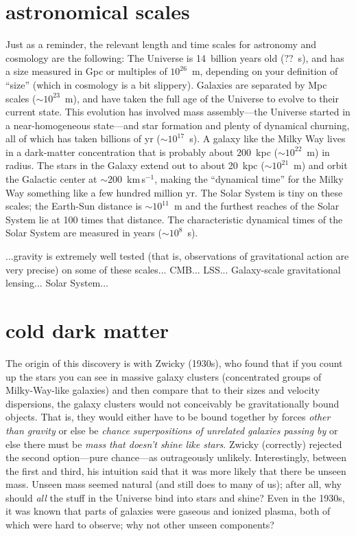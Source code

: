 \documentclass[12pt]{article}
\begin{document}
\section{astronomical scales}

Just as a reminder, the relevant length and time scales for astronomy
and cosmology are the following: The Universe is 14~billion years old
($??$~s), and has a size measured in Gpc or multiples of $10^{26}$~m,
depending on your definition of ``size'' (which in cosmology is a bit
slippery).  Galaxies are separated by Mpc scales ($\sim 10^{23}$~m),
and have taken the full age of the Universe to evolve to their current
state.  This evolution has involved mass assembly---the Universe
started in a near-homogeneous state---and star formation and plenty of
dynamical churning, all of which has taken billions of yr ($\sim
10^17$~s).  A galaxy like the Milky Way lives in a dark-matter
concentration that is probably about $200$~kpc ($\sim 10^{22}$~m) in
radius.  The stars in the Galaxy extend out to about 20~kpc ($\sim
10^{21}$~m) and orbit the Galactic center at $\sim 200$~km\,s$^{-1}$,
making the ``dynamical time'' for the Milky Way something like a few
hundred million yr.  The Solar System is tiny on these scales; the
Earth-Sun distance is $\sim 10^{11}$~m and the furthest reaches of the
Solar System lie at 100 times that distance.  The characteristic
dynamical times of the Solar System are measured in years ($\sim
10^8$~s).

...gravity is extremely well tested (that is, observations of
gravitational action are very precise) on some of these
scales... CMB... LSS... Galaxy-scale gravitational lensing... Solar
System...

\section{cold dark matter}

The origin of this discovery is with Zwicky (1930s), who found that if
you count up the stars you can see in massive galaxy clusters
(concentrated groups of Milky-Way-like galaxies) and then compare that
to their sizes and velocity dispersions, the galaxy clusters would not
conceivably be gravitationally bound objects.  That is, they would
either have to be bound together by forces \emph{other than gravity}
or else be \emph{chance superpositions of unrelated galaxies passing
  by} or else there must be \emph{mass that doesn't shine like stars}.
Zwicky (correctly) rejected the second option---pure chance---as
outrageously unlikely.  Interestingly, between the first and third,
his intuition said that it was more likely that there be unseen mass.
Unseen mass seemed natural (and still does to many of us); after all,
why should \emph{all} the stuff in the Universe bind into stars and
shine?  Even in the 1930s, it was known that parts of galaxies were
gaseous and ionized plasma, both of which were hard to observe; why
not other unseen components?
\end{document}
